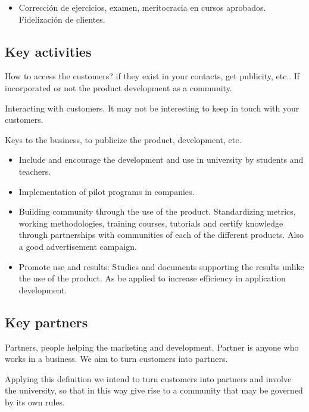 \documentclass[11pt]{scrartcl}
\begin{document}
\par 
\begin{itemize}
    \item Corrección de ejercicios, examen, meritocracia en cursos aprobados. Fidelización de clientes.
\end{itemize}

\subsection{Key activities}

\par How to access the customers? if they exist in your contacts, get publicity, etc.. If incorporated or not the product development as a community.

\par Interacting with customers. It may not be interesting to keep in touch with your customers.

\par Keys to the business, to publicize the product, development, etc.
\begin{itemize}
    \item Include and encourage the development and use in university by students and teachers.
    \item Implementation of pilot programs in companies.
    \item Building community through the use of the product. Standardizing metrics, working methodologies, training courses, tutorials and certify knowledge through partnerships with communities of each of the different products. Also a good advertisement campaign.
    \item Promote use and results: Studies and documents supporting the results unlike the use of the product. As be applied to increase efficiency in application development.
\end{itemize}

\subsection{Key partners}

\par Partners, people helping the marketing and development. Partner is anyone who works in a business. We aim to turn customers into partners.

\par Applying this definition we intend to turn customers into partners and involve the university, so that in this way give rise to a community that may be governed by its own rules.
\end{document}
